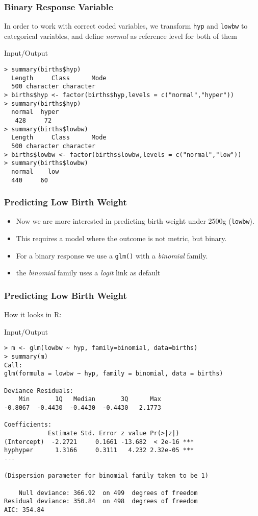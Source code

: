 \begin{frame}[fragile]\frametitle{Binary Response Variable}
In order to work with correct coded variables, we transform \texttt{hyp} and \texttt{lowbw} to categorical variables, and define \textit{normal} as reference level for both of them
\begin{exampleblock}{Input/Output}\scriptsize
\begin{verbatim}
> summary(births$hyp)
  Length     Class      Mode 
  500 character character 
> births$hyp <- factor(births$hyp,levels = c("normal","hyper"))
> summary(births$hyp)
  normal  hyper 
   428     72 
> summary(births$lowbw)
  Length     Class      Mode 
  500 character character 
> births$lowbw <- factor(births$lowbw,levels = c("normal","low"))
> summary(births$lowbw)
  normal    low 
  440     60 
\end{verbatim}
\end{exampleblock}
\end{frame}


\begin{frame}[fragile]\frametitle{Predicting Low Birth Weight}
\begin{itemize}
\item Now we are more interested in predicting birth weight under 2500g (\texttt{lowbw}). 
\item This requires a model where the outcome is not metric, but binary. 
\item For a binary response we use a \texttt{glm()} with a \emph{binomial} family.
\item the \emph{binomial} family uses  a \emph{logit} link as default
\end{itemize}
\end{frame}


\begin{frame}[fragile]\frametitle{Predicting Low Birth Weight}\footnotesize
How it looks in R:
\begin{exampleblock}{Input/Output}\scriptsize
\begin{verbatim}
> m <- glm(lowbw ~ hyp, family=binomial, data=births)
> summary(m)
Call:
glm(formula = lowbw ~ hyp, family = binomial, data = births)

Deviance Residuals: 
    Min       1Q   Median       3Q      Max  
-0.8067  -0.4430  -0.4430  -0.4430   2.1773  

Coefficients:
            Estimate Std. Error z value Pr(>|z|)    
(Intercept)  -2.2721     0.1661 -13.682  < 2e-16 ***
hyphyper      1.3166     0.3111   4.232 2.32e-05 ***
---

(Dispersion parameter for binomial family taken to be 1)

    Null deviance: 366.92  on 499  degrees of freedom
Residual deviance: 350.84  on 498  degrees of freedom
AIC: 354.84

\end{verbatim}
\end{exampleblock}
\end{frame}


